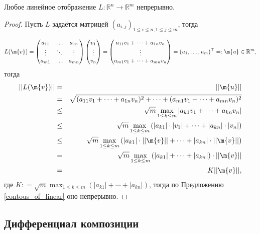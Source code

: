 \begin{lemma}\label{linear_is_contious}
    Любое линейное отображение $L: \mathbb{R}^n \to \mathbb{R}^m$ непрерывно. 
\end{lemma}
\begin{proof}
Пусть $L$ задаётся матрицей $(a_{i,j})_{1\le i \le n, 1 \le j \le m}$, тогда

\[
 L(\m{v}) = \begin{pmatrix}
     a_{11} & \ldots & a_{1n} \\
     \vdots & \ddots & \vdots \\
     a_{m1} & \ldots & a_{mn}
 \end{pmatrix}   \begin{pmatrix}
     v_1 \\ \vdots \\ v_n
 \end{pmatrix} = \begin{pmatrix}
     a_{11}v_1 + \cdots + a_{1n}v_n \\
     \vdots \\
     a_{m1}v_1 + \cdots + a_{mn}v_n 
 \end{pmatrix} = (u_1, \ldots, u_m)^\top =:\m{u} \in \mathbb{R}^m,
\] 
тогда
\begin{eqnarray*}
    ||L(\m{v})|| &=& ||\m{u}|| \\
    &=& \sqrt{(a_{11}v_1 + \cdots + a_{1n}v_n)^2 + \cdots + (a_{m1}v_1 + \cdots + a_{mn}v_n)^2} \\
    &\le & \sqrt{ m } \max_{1 \le k \le m} \left| a_{k1}v_1 + \cdots + a_{kn}v_n  \right| \\
    &\le & \sqrt{ m } \max_{1 \le k \le m} \left( |a_{k1}| \cdot |v_1| + \cdots + |a_{kn}| \cdot |v_n| \right) \\
    &\le & \sqrt{ m } \max_{1 \le k \le m} \left(|a_{k1}| \cdot || \m{v}|| + \cdots + |a_{kn}| \cdot || \m{v}||  \right) \\
    &=& \sqrt{ m } \max_{1 \le k \le m}\left(|a_{k1}|  + \cdots + |a_{kn}|   \right) \cdot || \m{v}|| \\
    &=& K || \m{v}||,
\end{eqnarray*}
где $K: = \sqrt{ m } \max_{1 \le k \le m}\left(|a_{k1}|  + \cdots + |a_{kn}|   \right)$, тогда по Предложению \ref{contous_of_linear} оно непрерывно. 
\end{proof}


\subsection{Дифференциал композиции}


